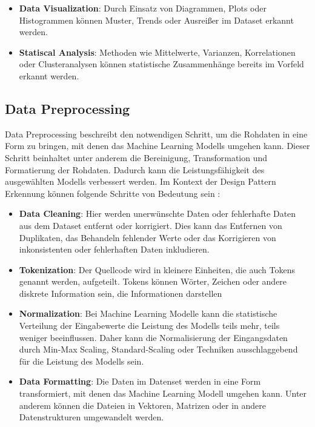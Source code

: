 \documentclass[conference]{IEEEtran}
\begin{document}
\begin{itemize}
    \item \textbf{Data Visualization}: Durch Einsatz von Diagrammen, Plots oder Histogrammen können Muster, Trends oder Ausreißer im Dataset erkannt werden.
    \item \textbf{Statiscal Analysis}: Methoden wie Mittelwerte, Varianzen, Korrelationen oder Clusteranalysen können statistische Zusammenhänge bereits im Vorfeld erkannt werden.
\end{itemize}


\subsection{Data Preprocessing}

Data Preprocessing beschreibt den notwendigen Schritt, um die Rohdaten in eine Form zu bringen, mit denen das Machine Learning Modells umgehen kann.
Dieser Schritt beinhaltet unter anderem die Bereinigung, Transformation und Formatierung der Rohdaten. Dadurch kann die Leistungsfähigkeit des ausgewählten Modells verbessert werden.
Im Kontext der Design Pattern Erkennung können folgende Schritte von Bedeutung sein \cite{Anunaya_2023}:

\begin{itemize}
    \item \textbf{Data Cleaning}: Hier werden unerwünschte Daten oder fehlerhafte Daten aus dem Dataset entfernt oder korrigiert. Dies kann das Entfernen von Duplikaten, das Behandeln fehlender Werte oder das Korrigieren von inkonsistenten oder fehlerhaften Daten inkludieren.
    \item \textbf{Tokenization}: Der Quellcode wird in kleinere Einheiten, die auch Tokens genannt werden, aufgeteilt. Tokens können Wörter, Zeichen oder andere diskrete Information sein, die Informationen darstellen
    \item \textbf{Normalization}: Bei Machine Learning Modelle kann die statistische Verteilung der Eingabewerte die Leistung des Modells teils mehr, teils weniger beeinflussen. Daher kann die Normalisierung der Eingangsdaten durch Min-Max Scaling, Standard-Scaling oder Techniken ausschlaggebend für die Leistung des Modells sein.
    \item \textbf{Data Formatting}: Die Daten im Datenset werden in eine Form transformiert, mit denen das Machine Learning Modell umgehen kann. Unter anderem können die Dateien in Vektoren, Matrizen oder in andere Datenstrukturen umgewandelt werden.
\end{itemize}
\end{document}
